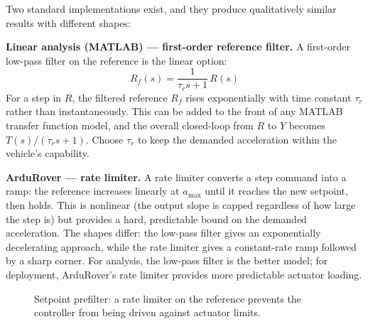 \documentclass[12pt]{article}
\begin{document}
Two standard implementations exist, and they produce qualitatively similar
results with different shapes:

\textbf{Linear analysis (MATLAB) --- first-order reference filter.}
A first-order low-pass filter on the reference is the linear option:
\begin{equation}
  R_f(s) = \frac{1}{\tau_r s + 1}\,R(s)
  \label{eq:reffilter}
\end{equation}
For a step in $R$, the filtered reference $R_f$ rises exponentially with
time constant $\tau_r$ rather than instantaneously.  This can be added to
the front of any MATLAB transfer function model, and the overall closed-loop
from $R$ to $Y$ becomes $T(s)/(\tau_r s + 1)$.  Choose $\tau_r$ to keep
the demanded acceleration within the vehicle's capability.

\textbf{ArduRover --- rate limiter.}
A rate limiter converts a step command into a ramp: the reference increases
linearly at $a_\mathrm{max}$ until it reaches the new setpoint, then holds.
This is nonlinear (the output slope is capped regardless of how large the
step is) but provides a hard, predictable bound on the demanded acceleration.
The shapes differ: the low-pass filter gives an exponentially decelerating
approach, while the rate limiter gives a constant-rate ramp followed by
a sharp corner.  For analysis, the low-pass filter is the better model; for
deployment, ArduRover's rate limiter provides more predictable actuator
loading.

\begin{figure}[htbp]
\centering
{}
\caption{Setpoint prefilter: a rate limiter on the reference prevents the
  controller from being driven against actuator limits.}
\label{fig:prefilter}
\end{figure}
\end{document}
